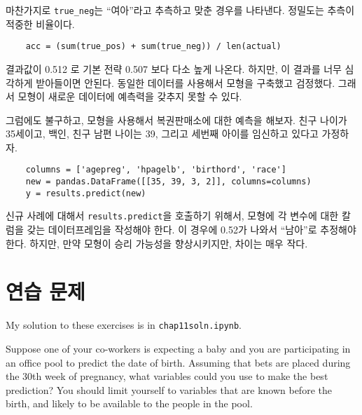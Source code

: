 마찬가지로 \verb"true_neg"는 ``여아''라고 추측하고 맞춘 경우를 나타낸다. 정밀도는 추측이 적중한 비율이다.

\begin{verbatim}
    acc = (sum(true_pos) + sum(true_neg)) / len(actual)
\end{verbatim}

결과값이 0.512 로 기본 전략 0.507 보다 다소 높게 나온다.
하지만, 이 결과를 너무 심각하게 받아들이면 안된다. 
동일한 데이터를 사용해서 모형을 구축했고 검정했다.
그래서 모형이 새로운 데이터에 예측력을 갖추지 못할 수 있다.

그럼에도 불구하고, 모형을 사용해서 복권판매소에 대한 예측을 해보자.
친구 나이가 35세이고, 백인, 친구 남편 나이는 39, 그리고 세번째 아이를 임신하고 있다고 가정하자.

\begin{verbatim}
    columns = ['agepreg', 'hpagelb', 'birthord', 'race']
    new = pandas.DataFrame([[35, 39, 3, 2]], columns=columns)
    y = results.predict(new)
\end{verbatim}

신규 사례에 대해서 {\tt results.predict}을 호출하기 위해서, 
모형에 각 변수에 대한 칼럼을 갖는 데이터프레임을 작성해야 한다. 
이 경우에 0.52가 나와서 ``남아''로 추정해야 한다. 하지만, 만약 모형이 승리 가능성을 향상시키지만, 차이는 매우 작다.



\section{연습 문제}

My solution to these exercises is in \verb"chap11soln.ipynb".

\begin{exercise}
Suppose one of your co-workers is expecting a baby and you are
participating in an office pool to predict the date of birth.
Assuming that bets are placed during the 30th week of pregnancy, what
variables could you use to make the best prediction?  You should limit
yourself to variables that are known before the birth, and likely to
be available to the people in the pool.

\end{exercise}



